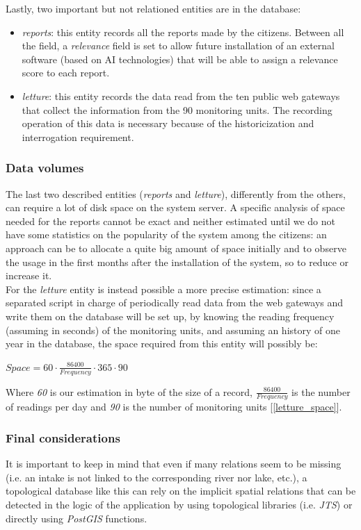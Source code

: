 Lastly, two important but not relationed entities are in the database:
\begin{itemize}
    \item \textit{reports}: this entity records all the reports made by the citizens. Between all the field, a \textit{relevance} field is set to allow future installation of an external software (based on AI technologies) that will be able to assign a relevance score to each report.
    \item \textit{letture}: this entity records the data read from the ten public web gateways that collect the information from the 90 monitoring units. The recording operation of this data is necessary because of the historicization and interrogation requirement.
\end{itemize}

\subsubsection{Data volumes}
The last two described entities (\textit{reports} and \textit{letture}), differently from the others, can require a lot of disk space on the system server.
A specific analysis of space needed for the reports cannot be exact and neither estimated until we do not have some statistics on the popularity of the system among the citizens: an approach can be to allocate a quite big amount of space initially and to observe the usage in the first months after the installation of the system, so to reduce or increase it. \\
For the \textit{letture} entity is instead possible a more precise estimation: since a separated script in charge of periodically read data from the web gateways and write them on the database will be set up, by knowing the reading frequency (assuming in seconds) of the monitoring units, and assuming an history of one year in the database, the space required from this entity will possibly be: \\
\begin{center}
    \begin{math}
        Space = 60\cdot\frac{86400}{Frequency}\cdot365\cdot90
    \end{math}
    \label{letture_space}
\end{center}
Where \textit{60} is our estimation in byte of the size of a record, \(\frac{86400}{Frequency}\) is the number of readings per day and \textit{90} is the number of monitoring units [\ref{letture_space}].
    
\subsubsection{Final considerations}
It is important to keep in mind that even if many relations seem to be missing (i.e. an intake is not linked to the corresponding river nor lake, etc.), a topological database like this can rely on the implicit spatial relations that can be detected in the logic of the application by using topological libraries (i.e. \textit{JTS}) or directly using \textit{PostGIS} functions. 





